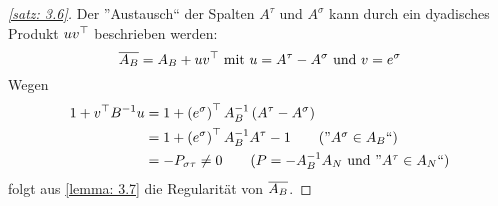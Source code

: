 \begin{proof}[\cref{satz: 3.6}]
	Der ''Austausch`` der Spalten $A^\tau$ und $A^\sigma$ kann durch ein dyadisches Produkt $u v^{\top}$ beschrieben werden:
	\begin{equation*}
		\overline{A_B} = A_B + u v^{\top} \text{ mit } u = A^\tau - A^\sigma \text{ und } v = e^\sigma 
	\end{equation*}
	Wegen
	\begin{align*}
		1 + \trans{v} B^{-1} u &= 1 + \transpose{e^\sigma} A_B^{-1} \brackets{A^\tau - A^\sigma} \\ 
		&= 1 + \transpose{e^\sigma} A_B^{-1} A^\tau - 1 \tag{''$A^\sigma \in A_B$``} \\
		&= - P_{\sigma \tau} \neq 0
		\tag{$P = -A_B^{-1}A_N$ und ''$A^\tau \in A_N$``}
	\end{align*}
	folgt aus \cref{lemma: 3.7} die Regularität von $\overline{A_B}$.
\end{proof}

